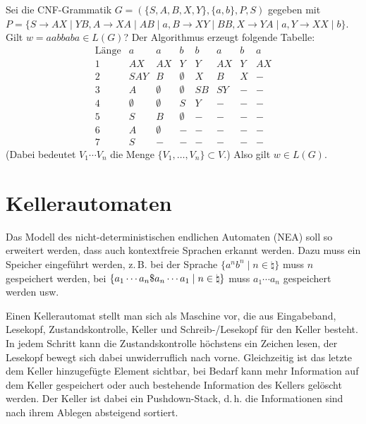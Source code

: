 \linie

\begin{Bsp}
    Sei die CNF-Grammatik $G = (\{S, A, B, X, Y\}, \{a, b\}, P, S)$
    gegeben mit\\
    $P = \{S \rightarrow AX \;|\; YB,
    A \rightarrow XA \;|\; AB \;|\; a,
    B \rightarrow XY \;|\; BB,
    X \rightarrow YA \;|\; a,
    Y \rightarrow XX \;|\; b\}$.\\
    Gilt $w = aabbaba \in L(G)$?
    Der Algorithmus erzeugt folgende Tabelle:
    \[\begin{array}{r|c|c|c|c|c|c|c}
        \text{Länge} & a & a & b & b & a & b & a \\\hline
        1 & AX & AX & Y & Y & AX & Y & AX \\\hline
        2 & SAY & B & \emptyset & X & B & X & - \\\hline
        3 & A & \emptyset & \emptyset & SB & SY & - & - \\\hline
        4 & \emptyset & \emptyset & S & Y & - & - & - \\\hline
        5 & S & B & \emptyset & - & - & - & - \\\hline
        6 & A & \emptyset & - & - & - & - & - \\\hline
        7 & S & - & - & - & - & - & -
    \end{array}\]
    (Dabei bedeutet $V_1 \dotsb V_n$ die Menge
    $\{V_1, \dotsc, V_n\} \subset V$.)
    Also gilt $w \in L(G)$.
\end{Bsp}

\pagebreak

\section{%
    Kellerautomaten%
}

\begin{Bem}
    Das Modell des nicht-deterministischen endlichen Automaten (NEA) soll so
    erweitert werden, dass auch kontextfreie Sprachen erkannt werden.
    Dazu muss ein Speicher eingeführt werden, z.\,B. bei der Sprache
    $\{a^n b^n \;|\; n \in \natural\}$ muss $n$ gespeichert werden,
    bei $\{a_1 \dotsb a_n \$ a_n \dotsb a_1 \;|\; n \in \natural\}$
    muss $a_1 \dotsb a_n$ gespeichert werden usw.
\end{Bem}

\begin{Bem}
    Einen Kellerautomat stellt man sich als Maschine vor, die aus
    Eingabeband, Lesekopf, Zustandskontrolle, Keller und
    Schreib-/Lesekopf für den Keller besteht.
    In jedem Schritt kann die Zustandskontrolle höchstens ein Zeichen lesen,
    der Lesekopf bewegt sich dabei unwiderruflich nach vorne.
    Gleichzeitig ist das letzte dem Keller hinzugefügte Element sichtbar,
    bei Bedarf kann mehr Information auf dem Keller gespeichert oder
    auch bestehende Information des Kellers gelöscht werden.
    Der Keller ist dabei ein Pushdown-Stack, d.\,h. die Informationen sind
    nach ihrem Ablegen absteigend sortiert.
\end{Bem}

